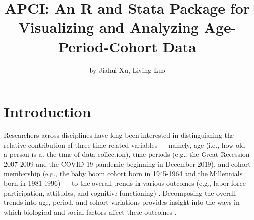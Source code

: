 \title{APCI: An R and Stata Package for Visualizing and Analyzing Age-Period-Cohort Data}
\author{by Jiahui Xu, Liying Luo}

\maketitle


\section{Introduction} \label{introduction}

Researchers across disciplines have long been interested in distinguishing the relative contribution of three time-related variables — namely, age (i.e., how old a person is at the time of data collection), time periods (e.g., the Great Recession 2007-2009 and the COVID-19 pandemic beginning in December 2019), and cohort membership (e.g., the baby boom cohort born in 1945-1964 and the Millennials born in 1981-1996) — to the overall trends in various outcomes (e.g., labor force participation, attitudes, and cognitive functioning) \citep{alwin_generations_2003, clogg_cohort_1982,pescosolido2021trends}.  Decomposing the overall trends into age, period, and cohort variations provides insight into the ways in which biological and social factors affect these outcomes \citep{hobcraft_age_1982, heckman_using_1985, fosse_analyzing_2019}. 

